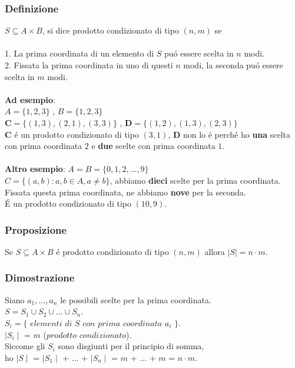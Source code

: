 \documentclass[11pt]{article}
\begin{document}
            \subsubsection{Definizione}
            $S \subseteq A\times B$, si dice prodotto condizionato di tipo $(n,m)$ se \\
            \\
            1. La prima coordinata di un elemento di $S$ pu\'o essere scelta in $n$ modi.\\
            2. Fissata la prima coordinata in uno di questi $n$ modi, la seconda pu\'o essere scelta in $m$ modi.\\
            \\
            \textbf{Ad esempio}:\\
            $A=\{1,2,3\}$ , $B=\{1,2,3\}$ \\
            $\textbf{C}=\{(1,3),(2,1),(3,3)\}$ , $\textbf{D}=\{(1,2),(1,3),(2,3)\}$\\
            \textbf{C} \'e un prodotto condizionato di tipo $(3,1)$, \textbf{D} non lo \'e perch\'e ho \textbf{una} scelta con prima coordinata $2$ e \textbf{due} scelte con prima coordinata $1$.\\
            \\ \textbf{Altro esempio}:
            $A=B=\{0,1,2,...,9\}$\\
            $C=\{(a,b):a,b \in A, a \neq b\}$, abbiamo \textbf{dieci} scelte per la prima coordinata. Fissata questa prima coordinata, ne abbiamo \textbf{nove} per la seconda.\\
            \'E un prodotto condizionato di tipo $(10,9)$.
            \subsubsection{Proposizione}
            Se $S \subseteq A \times B$ \'e prodotto condizionato di tipo $(n,m)$ allora $\mid S \mid = n \cdot m$.
            \subsubsection{Dimostrazione}
            Siano $a_1,...,a_n$ le possibili scelte per la prima coordinata.\\
            $S=S_1 \cup S_2 \cup ... \cup S_n$.\\
            $S_i = \{$ $elementi$ $di$ $S$ $con$ $prima$ $coordinata$ $a_i$ $\}$.\\
            $\mid S_i \mid$ = $m$ ($prodotto$ $condizionato$).\\
            Siccome gli $S_i$ sono disgiunti per il principio di somma, \\
            ho $\mid S \mid$ = $\mid S_1 \mid$ + ... + $\mid S_n \mid$ = $m$ + $...$ + $m$ = $n \cdot m$.
            
\end{document}
